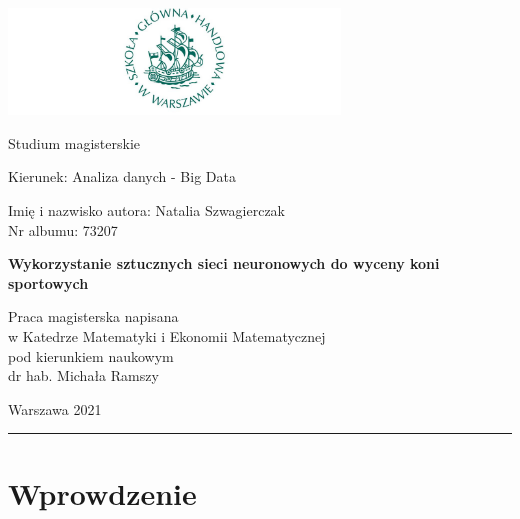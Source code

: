 \documentclass[polish, twoside, 12pt, a4paper]{article}
\theoremstyle{definition}
\theoremstyle{plain}
\theoremstyle{remark}
\begin{document}
\begin{titlepage}
\centering

\includegraphics[width=0.66\textwidth]{logo.JPG}

\vspace*{1cm}
Studium magisterskie\\
\begin{flushleft}
Kierunek: Analiza danych - Big Data\\
\end{flushleft}

\vspace*{1cm}
\rule{0cm}{1cm}\hfill
\begin{minipage}{9cm}
Imię i nazwisko autora: Natalia Szwagierczak\\
Nr albumu: 73207
\end{minipage}

\vspace*{2cm}
\begin{minipage}{12cm}
\centering
\Large
\textbf{Wykorzystanie sztucznych sieci neuronowych do wyceny koni sportowych}
\end{minipage}

\vspace*{2cm}
\rule{0cm}{1cm}\hfill
\begin{minipage}{9cm}
Praca magisterska napisana\\
w Katedrze Matematyki i Ekonomii Matematycznej\\
pod kierunkiem naukowym\\
dr hab. Michała Ramszy
\end{minipage}

\vfill
Warszawa 2021
\end{titlepage}

\rule{1ex}{0ex}\clearpage


\cleardoublepage
\tableofcontents

\cleardoublepage
\section{Wprowdzenie}
\end{document}
